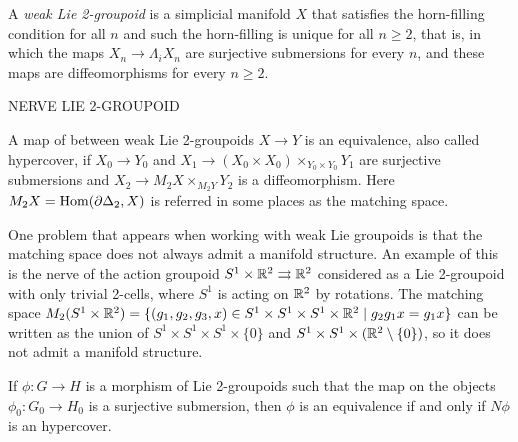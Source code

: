 
A \emph{weak Lie 2-groupoid} is a simplicial manifold $X$ that satisfies the horn-filling condition for all $n$ and such the horn-filling is unique for all $n\geq 2$, that is, in which the maps $X_n\to \Lambda_i X_n$ are surjective submersions for every $n$, and these maps are diffeomorphisms for every $n\geq 2$.

\bigskip
\noi NERVE LIE 2-GROUPOID
\bigskip

A map of between weak Lie 2-groupoids $X\to Y$ is an equivalence, also called hypercover, if $X_0\to Y_0$ and $X_1\to (X_0\times X_0)\times_{Y_0\times Y_0} Y_1$ are surjective submersions and $X_2\to M_2X\times_{M_2Y} Y_2$ is a diffeomorphism.
Here $M_2X = \operatorname{Hom}(\partial\Delta_2, X)$ is referred in some places as the matching space.

One problem that appears when working with weak Lie groupoids is that the matching space does not always admit a manifold structure.
An example of this is the nerve of the action groupoid $S^1\times\mathbb R^2 \rightrightarrows \mathbb R^2$ considered as a Lie 2-groupoid with only trivial 2-cells, where $S^1$ is acting on $\mathbb R^2$ by rotations.
The matching space
$ M_2(S^1\times\mathbb R^2) = \{ (g_1,g_2,g_3,x)\in S^1\times S^1\times S^1\times\mathbb R^2 \mid g_2g_1 x = g_1 x \} $
can be written as the union of $S^1\times S^1\times S^1\times \{0\}$ and $S^1\times S^1\times (\mathbb R^2\setminus \{0\})$, so it does not admit a manifold structure.

\begin{prop}
If $\phi\colon G\to H$ is a morphism of Lie 2-groupoids such that the map on the objects $\phi_0\colon G_0\to H_0$ is a surjective submersion, then $\phi$ is an equivalence if and only if $N\phi$ is an hypercover.
\end{prop}

